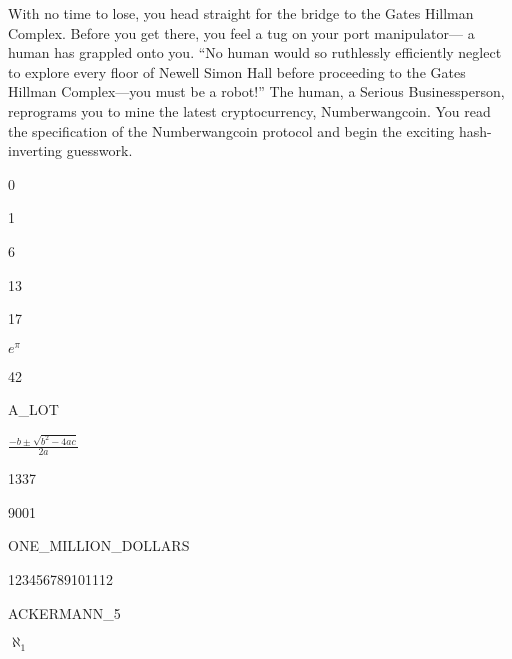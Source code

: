 With no time to lose,
you head straight for the bridge to the Gates Hillman Complex.
Before you get there, you feel a tug on your port manipulator---%
a human has grappled onto you.
``No human would so ruthlessly efficiently neglect to explore
every floor of Newell Simon Hall before proceeding to
the Gates Hillman Complex---you must be a robot!''
The human, a Serious Businessperson,
reprograms you to mine the latest cryptocurrency, Numberwangcoin.
You read the specification of the Numberwangcoin protocol \citep{rob}
and begin the exciting hash-inverting guesswork.

\begin{switch}
\item{0}
\item{1}
\item{6}
\item{13}
\item{17}
\item{$e^\pi$}
\item{42}
\item{A\_LOT}
\item{$\frac{-b \pm \sqrt{b^2 - 4ac}}{2a}$}
\item{1337}
\item{9001}
\item{ONE\_MILLION\_DOLLARS}
\item{123456789101112}
\item{ACKERMANN\_5}
\item{$\aleph_1$}
\end{switch}


